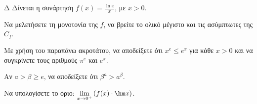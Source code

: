 \begin{thema}{Δ}
Δίνεται η συνάρτηση $f(x) = \frac{\ln x}{x}$, με $x > 0$.
\begin{erwthma}
    \item Να μελετήσετε τη μονοτονία της $f$, να βρείτε το ολικό μέγιστο και τις ασύμπτωτες της $C_f$.
    \item Με χρήση του παραπάνω ακροτάτου, να αποδείξετε ότι $x^e \le e^x$ για κάθε $x > 0$ και να συγκρίνετε τους αριθμούς $\pi^e$ και $e^\pi$.
    \item Αν $a > \beta \ge e$, να αποδείξετε ότι $\beta^a > a^\beta$.
    \item Να υπολογίσετε το όριο: $\displaystyle \lim_{x \to 0^+} \left( f(x) \cdot \hm x \right)$.
\end{erwthma}
\end{thema}
